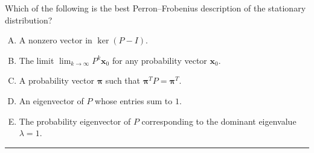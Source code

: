 \documentclass[12pt]{amsart}
\newcommand{\divider}{
  \vspace{-1em} %
  \noindent
  \raisebox{-0.15ex}{\textbullet}%
  \hspace{0.5em}%
  \rule[0.5ex]{0.95\textwidth}{1.0pt}%
  \hspace{0.5em}%
  \raisebox{-0.15ex}{\textbullet}%
  \vspace{0em} %
}
\begin{document}
Which of the following is the best Perron--Frobenius description of the
stationary distribution?

\begin{enumerate}[(A)]
\item A nonzero vector in $\ker(P-I)$.
\item The limit $\lim_{k\to\infty} P^k\mathbf{x}_0$ for any probability vector $\mathbf{x}_0$.
\item A probability vector $\boldsymbol{\pi}$ such that $\boldsymbol{\pi}^T P = \boldsymbol{\pi}^T$.
\item An eigenvector of $P$ whose entries sum to $1$.
\item The probability eigenvector of $P$ corresponding to the dominant eigenvalue $\lambda=1$.
\end{enumerate}

%
%
%
%
%
%
%
\divider
\end{document}
